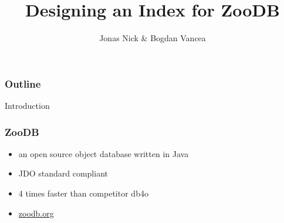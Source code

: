 \documentclass{beamer}
\title{Designing an Index for ZooDB}
\author{Jonas Nick \& Bogdan Vancea}
\begin{document}
  \frame{\titlepage}
  \begin{frame}
    \frametitle{Outline}
    \tableofcontents[hideallsubsections]
  \end{frame}

  \begin{section}{Introduction}
    \begin{frame}
      \frametitle{ZooDB}
      \begin{itemize}
        \item an open source object database written in Java
        \item JDO standard compliant
        \item 4 times faster than competitor db4o
        \item \url{zoodb.org}
      \end{itemize}


\end{frame}
\end{section}
\end{document}
